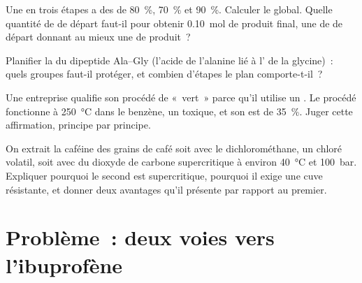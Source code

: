 \begin{exercise}[$\star\star\star$]\label{exo:g12:synthesis-strategy:12}
Une  en trois étapes a des  de \qty{80}{\percent},
\qty{70}{\percent} et \qty{90}{\percent}. Calculer le  global.
Quelle quantité de  de départ faut-il pour obtenir
\qty{0.10}{mol} de produit final, une  de  de départ donnant
au mieux une  de produit~?
\end{exercise}

\begin{exercise}[$\star\star\star$]\label{exo:g12:synthesis-strategy:13}
Planifier la  du dipeptide Ala--Gly (l'acide de l'alanine lié à
l' de la glycine)~: quels groupes faut-il protéger, et combien
d'étapes le plan comporte-t-il~?
\end{exercise}

\begin{exercise}[$\star\star\star$]\label{exo:g12:synthesis-strategy:14}
Une entreprise qualifie son procédé de «~vert~» parce qu'il utilise un
. Le procédé fonctionne à \qty{250}{\celsius} dans le benzène,
un  toxique, et son  est de \qty{35}{\percent}.
Juger cette affirmation, principe par principe.
\end{exercise}

\begin{exercise}[$\star\star\star$]\label{exo:g12:synthesis-strategy:15}
On extrait la caféine des grains de café soit avec le dichlorométhane,
un  chloré volatil, soit avec du dioxyde de carbone supercritique
à environ \qty{40}{\celsius} et \qty{100}{bar}. Expliquer pourquoi le
second est supercritique, pourquoi il exige une cuve résistante, et
donner deux avantages qu'il présente par rapport au premier.
\end{exercise}

\section{Problème~: deux voies vers l'ibuprofène}

